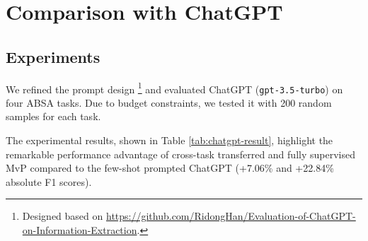 \documentclass[11pt]{article}
\begin{document}
\section{Comparison with ChatGPT}
\label{sec:appendix:chatgpt}

\subsection{Experiments}

We refined the prompt design \footnote{Designed based on \url{https://github.com/RidongHan/Evaluation-of-ChatGPT-on-Information-Extraction}.} and evaluated ChatGPT (\texttt{gpt-3.5-turbo}) on four ABSA tasks. Due to budget constraints, we tested it with 200 random samples for each task.

The experimental results, shown in Table \ref{tab:chatgpt-result}, highlight the remarkable performance advantage of cross-task transferred and fully supervised MvP compared to the few-shot prompted ChatGPT (+7.06\% and +22.84\% absolute F1 scores).
\end{document}
